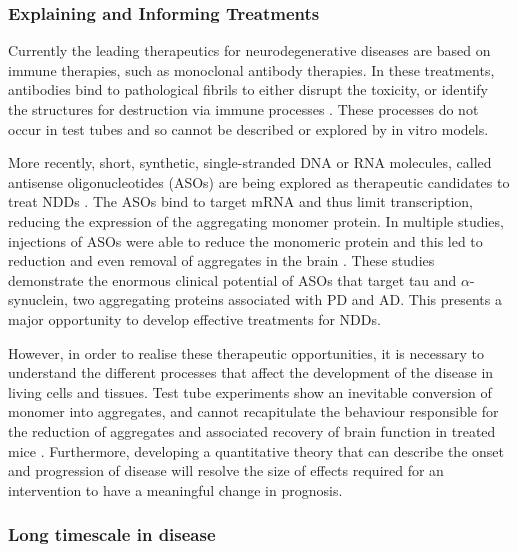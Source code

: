 \subsubsection{Explaining and Informing Treatments}

Currently the leading therapeutics for neurodegenerative diseases are based on immune therapies, such as monoclonal antibody therapies. In these treatments, antibodies bind to pathological fibrils to either disrupt the toxicity, or identify the structures for destruction via immune processes \cite{wisniewski_immunotherapeutic_2015, berg_biochemistry_2002}.  These processes do not occur in test tubes and so cannot be described or explored by in vitro models.

More recently, short, synthetic, single-stranded DNA or RNA molecules, called antisense oligonucleotides (ASOs) are being explored as therapeutic candidates to treat NDDs \cite{rinaldi_antisense_2018}. The ASOs bind to target mRNA and thus limit transcription, reducing the expression of the aggregating monomer protein. In multiple studies, injections of ASOs were able to reduce the monomeric protein and this led to reduction and even removal of aggregates in the brain \cite{cole_-synuclein_nodate, devos_tau_2017, mummery_tau-targeting_2023}. These studies demonstrate the enormous clinical potential of ASOs that target tau and $\alpha$-synuclein, two aggregating proteins associated with PD and AD. This presents a major opportunity to develop effective treatments for NDDs.

However, in order to realise these therapeutic opportunities, it is necessary to understand the different processes that affect the development of the disease in living cells and tissues. Test tube experiments show an inevitable conversion of monomer into aggregates, and cannot recapitulate the behaviour responsible for the reduction of aggregates and associated recovery of brain function in treated mice \cite{cole_-synuclein_nodate}. Furthermore, developing a quantitative theory that can describe the onset and progression of disease will resolve the size of effects required for an intervention to have a meaningful change in prognosis.

\subsubsection{Long timescale in disease}

